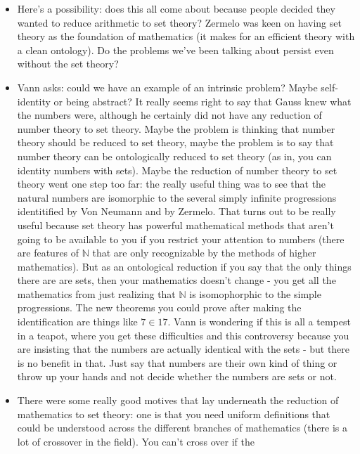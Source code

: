\documentclass[12pt]{article}
\theoremstyle{definition}
\begin{document}
\begin{itemize}
    \item
        Here's a possibility: does this all come about because people decided
        they wanted to reduce arithmetic to set theory? Zermelo was keen on
        having set theory as the foundation of mathematics (it makes for an
        efficient theory with a clean ontology). Do the problems we've been
        talking about persist even without the set theory?
    \item
        Vann asks: could we have an example of an intrinsic problem? Maybe
        self-identity or being abstract? It really seems right to say that
        Gauss knew what the numbers were, although he certainly did not have
        any reduction of number theory to set theory. Maybe the problem is
        thinking that number theory should be reduced to set theory, maybe the
        problem is to say that number theory can be ontologically reduced to
        set theory (as in, you can identity numbers with sets). Maybe the
        reduction of number theory to set theory went one step too far: the
        really useful thing was to see that the natural numbers are isomorphic
        to the several simply infinite progressions identitified by Von Neumann
        and by Zermelo. That turns out to be really useful because set theory
        has powerful mathematical methods that aren't going to be available to
        you if you restrict your attention to numbers (there are features of
        $\mathbb{N}$ that are only recognizable by the methods of higher
        mathematics). But as an ontological reduction if you say that the only
        things there are are sets, then your mathematics doesn't change - you
        get all the mathematics from just realizing that $\mathbb{N}$ is
        isomophorphic to the simple progressions. The new theorems you could
        prove after making the identification are things like $7 \in 17$. Vann
        is wondering if this is all a tempest in a teapot, where you get these
        difficulties and this controversy because you are insisting that the
        numbers are actually identical with the sets - but there is no benefit
        in that. Just say that numbers are their own kind of thing or throw up
        your hands and not decide whether the numbers are sets or not.
    \item
        There were some really good motives that lay underneath the reduction
        of mathematics to set theory: one is that you need uniform definitions
        that could be understood across the different branches of mathematics
        (there is a lot of crossover in the field). You can't cross over if the

\end{itemize}
\end{document}
